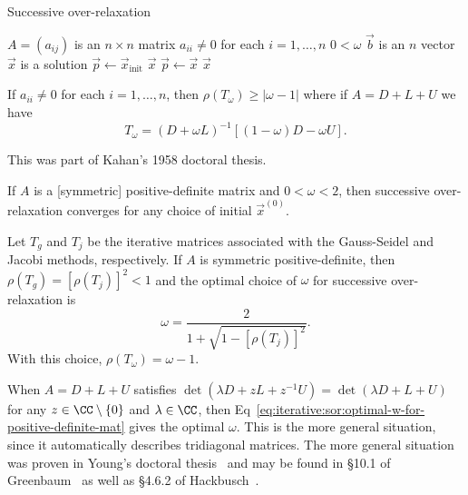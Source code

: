 \begin{algorithm}\label{alg:iterative-linear:sor:sor}
  \caption{Successive over-relaxation}
  \begin{algorithmic}[1]
    \Require $A=(a_{ij})$ is an $n\times n$ matrix
    \Require $a_{ii}\neq0$ for each $i=1,\dots,n$
    \Require $0<\omega$
    \Require $\vec{b}$ is an $n$ vector
    \Ensure $\vec{x}$ is a solution
    \State $\vec{p}\gets\vec{x}_{\text{init}}$ 
      \EndFor
        \State\Return $\vec{x}$
      \EndIf
      \State $\vec{p}\gets\vec{x}$
    \EndFor
    \State\Return $\vec{x}$
  \EndFunction
\end{algorithmic}
\end{algorithm}


\begin{theorem}[Kahan]
If $a_{ii}\neq0$ for each $i=1,\dots,n$, then
$\rho(T_{\omega})\geq|\omega-1|$ where if $A=D+L+U$ we have
\[ T_{\omega} = (D+\omega L)^{-1}[(1-\omega)D-\omega U]. \]
\end{theorem}

This was part of Kahan's 1958 doctoral thesis.

\begin{theorem}
If $A$ is a [symmetric] positive-definite matrix and $0<\omega<2$, then
successive over-relaxation converges for any choice of initial $\vec{x}^{(0)}$.
\end{theorem}

\begin{theorem}
Let $T_{g}$ and $T_{j}$ be the iterative matrices associated with the
Gauss-Seidel and Jacobi methods, respectively. If $A$ is symmetric
positive-definite, then $\rho(T_{g})=[\rho(T_{j})]^{2}<1$ and the
optimal choice of $\omega$ for successive over-relaxation is
\begin{equation}\label{eq:iterative:sor:optimal-w-for-positive-definite-mat}
\omega = \frac{2}{1 + \sqrt{1 - [\rho(T_{j})]^{2}}}.
\end{equation}
With this choice, $\rho(T_{\omega})=\omega-1$.
\end{theorem}

\begin{rmk}
When $A=D+L+U$ satisfies $\det(\lambda D+zL+z^{-1}U)=\det(\lambda D+L+U)$
for any $z\in\CC\setminus\{0\}$ and $\lambda\in\CC$, then Eq~\eqref{eq:iterative:sor:optimal-w-for-positive-definite-mat}
gives the optimal $\omega$. This is the more general situation, since it
automatically describes tridiagonal matrices. The more general situation
was proven in Young's doctoral thesis~\cite{young1950} and may be found
in \S10.1 of Greenbaum~\cite{greenbaum1997iterative} as well as \S4.6.2 of Hackbusch~\cite{hackbusch2016iterative}.
\end{rmk}

